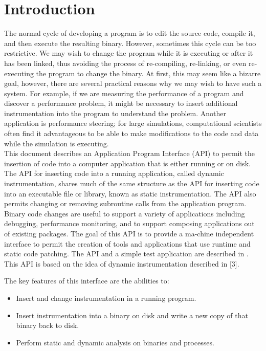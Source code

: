 \section{Introduction}

The normal cycle of developing a program is to edit the source code, compile it, and then execute the resulting binary.  However, sometimes this cycle can be too restrictive.  We may wish to change the program while it is executing or after it has been linked, thus avoiding the process of  re-compiling, re-linking, or even re-executing the program to change the binary.  At first, this may seem like a bizarre goal, however, there are several practical reasons why we may wish to have such a system.  For example, if we are measuring the performance of a program and discover a performance problem, it might be necessary to insert additional instrumentation into the program to understand the problem.  Another application is performance steering; for large simulations, computational scientists often find it advantageous to be able to make modifications to the code and data while the simulation is executing.\\


This document describes an Application Program Interface (API) to permit the insertion of code into a computer application that is either running or on disk.  The API for inserting code into a running application, called dynamic instrumentation, shares much of the same structure as the API for inserting code into an executable file or library, known as static instrumentation.  The API also permits changing or removing subroutine calls from the application program.  Binary code changes are useful to support a variety of applications including debugging, performance monitoring, and to support composing applications out of existing packages.  The goal of this API is to provide a ma-chine independent interface to permit the creation of tools and applications that use runtime and static code patching.  The API and a simple test application are described in \cite{api-code-patching}.  This API is based on the idea of dynamic instrumentation described in [3].

The key features of this interface are the abilities to:
\begin{itemize}
	\item 	Insert and change instrumentation in a running program.
	\item Insert instrumentation into a binary on disk and write a new copy of that binary back to disk.
	\item Perform static and dynamic analysis on binaries and processes.
\end{itemize}


